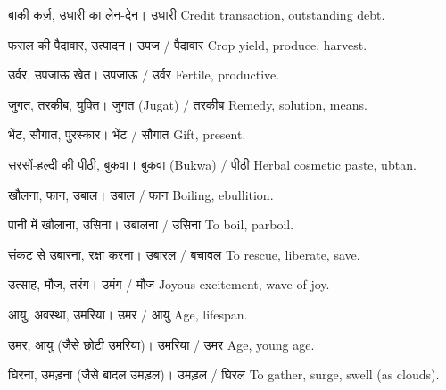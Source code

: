 %
{बाकी कर्ज़, उधारी का लेन-देन।}%
{उधारी}%
{Credit transaction, outstanding debt.}

%
{फसल की पैदावार, उत्पादन।}%
{उपज / पैदावार}%
{Crop yield, produce, harvest.}

%
{उर्वर, उपजाऊ खेत।}%
{उपजाऊ / उर्वर}%
{Fertile, productive.}

%
{जुगत, तरकीब, युक्ति।}%
{जुगत (Jugat) / तरकीब}%
{Remedy, solution, means.}

%
{भेंट, सौगात, पुरस्कार।}%
{भेंट / सौगात}%
{Gift, present.}

%
{सरसों-हल्दी की पीठी, बुकवा।}%
{बुकवा (Bukwa) / पीठी}%
{Herbal cosmetic paste, ubtan.}

%
{खौलना, फान, उबाल।}%
{उबाल / फान}%
{Boiling, ebullition.}

%
{पानी में खौलाना, उसिना।}%
{उबालना / उसिना}%
{To boil, parboil.}

%
{संकट से उबारना, रक्षा करना।}%
{उबारल / बचावल}%
{To rescue, liberate, save.}

%
{उत्साह, मौज, तरंग।}%
{उमंग / मौज}%
{Joyous excitement, wave of joy.}

%
{आयु, अवस्था, उमरिया।}%
{उमर / आयु}%
{Age, lifespan.}

%
{उमर, आयु (जैसे छोटी उमरिया)।}%
{उमरिया / उमर}%
{Age, young age.}

%
{घिरना, उमड़ना (जैसे बादल उमड़ल)।}%
{उमड़ल / घिरल}%
{To gather, surge, swell (as clouds).}

